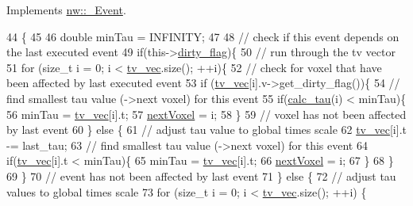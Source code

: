 Implements \hyperlink{classnw_1_1___event_a882115f8652c881bc8ed43f1050ccba3}{nw\+::\+\_\+\+Event}.


\begin{DoxyCode}
44                                           \{
45 
46     \textcolor{keywordtype}{double} minTau = INFINITY;
47 
48 \textcolor{comment}{//  check if this event depends on the last executed event}
49     \textcolor{keywordflow}{if}(this->\hyperlink{classnw_1_1___event_aaa705b35c06c0cb2e0a4f3daa9ee8037}{dirty\_flag})\{
50 \textcolor{comment}{//      run through the tv vector}
51         \textcolor{keywordflow}{for} (\textcolor{keywordtype}{size\_t} i = 0; i < \hyperlink{classnw_1_1___event_a6351b58d94923ed58e0b2cf6c9445d2e}{tv\_vec}.size(); ++i)\{
52 \textcolor{comment}{//          check for voxel that have been affected by last executed event}
53             \textcolor{keywordflow}{if} (\hyperlink{classnw_1_1___event_a6351b58d94923ed58e0b2cf6c9445d2e}{tv\_vec}[i].v->get\_dirty\_flag())\{
54 \textcolor{comment}{//              find smallest tau value (->next voxel) for this event}
55                 \textcolor{keywordflow}{if}(\hyperlink{classnw_1_1_reaction___evt_ace67f5106799204a2f2cde8c6982589b}{calc\_tau}(i) < minTau)\{
56                     minTau = \hyperlink{classnw_1_1___event_a6351b58d94923ed58e0b2cf6c9445d2e}{tv\_vec}[i].t;
57                     \hyperlink{classnw_1_1___event_a7864559e204c087306e3becb5b81fb26}{nextVoxel} = i;
58                 \}
59 \textcolor{comment}{//          voxel has not been affected by last event}
60             \} \textcolor{keywordflow}{else} \{
61 \textcolor{comment}{//              adjust tau value to global times scale}
62                 \hyperlink{classnw_1_1___event_a6351b58d94923ed58e0b2cf6c9445d2e}{tv\_vec}[i].t -= last\_tau;
63 \textcolor{comment}{//              find smallest tau value (->next voxel) for this event}
64                 \textcolor{keywordflow}{if}(\hyperlink{classnw_1_1___event_a6351b58d94923ed58e0b2cf6c9445d2e}{tv\_vec}[i].t < minTau)\{
65                     minTau = \hyperlink{classnw_1_1___event_a6351b58d94923ed58e0b2cf6c9445d2e}{tv\_vec}[i].t;
66                     \hyperlink{classnw_1_1___event_a7864559e204c087306e3becb5b81fb26}{nextVoxel} = i;
67                 \}
68             \}
69         \}
70 \textcolor{comment}{//  event has not been affected by last event}
71     \} \textcolor{keywordflow}{else}  \{
72 \textcolor{comment}{//      adjust tau values to global times scale}
73         \textcolor{keywordflow}{for} (\textcolor{keywordtype}{size\_t} i = 0; i < \hyperlink{classnw_1_1___event_a6351b58d94923ed58e0b2cf6c9445d2e}{tv\_vec}.size(); ++i) \{

\end{DoxyCode}
